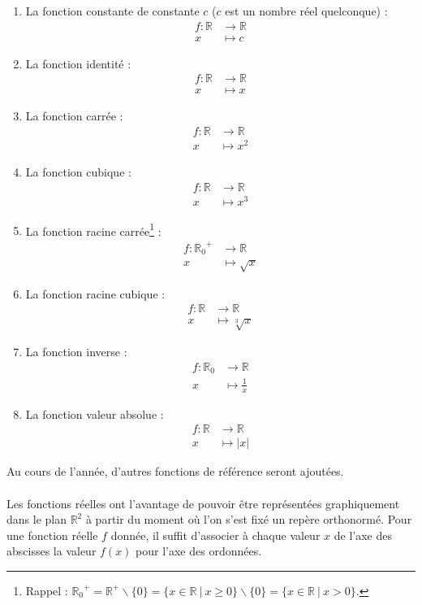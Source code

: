 \documentclass[a4paper,13pt]{scrreprt}
\theoremstyle{plain}
\theoremstyle{definition}
\newcommand{\rr}{\mathbb{R}}
\begin{document}
\begin{enumerate}
		\item La fonction constante de constante $c$ ($c$ est un nombre réel quelconque) : \begin{align*}
		f : \rr &\to \rr \\
		x &\mapsto c
		\end{align*}
		
	\item La fonction identité : \begin{align*}
	f : \rr &\to \rr \\
	x &\mapsto x
	\end{align*}
	
	\item La fonction carrée : \begin{align*}
	f : \rr &\to \rr \\
	x &\mapsto x^2
	\end{align*}
	
	\item La fonction cubique : \begin{align*}
	f : \rr &\to \rr \\
	x &\mapsto x^3
	\end{align*}
	
	\item La fonction racine carrée\footnote{Rappel : ${{\rr}_{0}}^{+} = {\rr}^{+} \backslash \{0\} = \{x \in \rr ~|~ x \ge 0 \} \backslash \{0\} = \{x \in \rr ~|~ x > 0 \}$.} : \begin{align*}
	f : {{\rr}_{0}}^{+} &\to \rr \\
	x &\mapsto \sqrt{x}
	\end{align*}
	
	\item La fonction racine cubique : \begin{align*}
	f : \rr &\to \rr \\
	x &\mapsto \sqrt[3]{x}
	\end{align*}
	
	\item La fonction inverse : \begin{align*}
	f : {\rr}_{0} &\to \rr \\
	x &\mapsto \frac{1}{x}
	\end{align*}
	
	\item La fonction valeur absolue : \begin{align*}
	f : \rr &\to \rr \\
	x &\mapsto |x|
	\end{align*}
\end{enumerate}
Au cours de l'année, d'autres fonctions de référence seront ajoutées. \\
~~\\
Les fonctions réelles ont l'avantage de pouvoir être représentées graphiquement dans le plan ${\rr}^{2}$ à partir du moment où l'on s'est fixé un repère orthonormé. Pour une fonction réelle $f$ donnée, il suffit d'associer à chaque valeur $x$ de l'axe des abscisses la valeur $f(x)$ pour l'axe des ordonnées.
\end{document}
